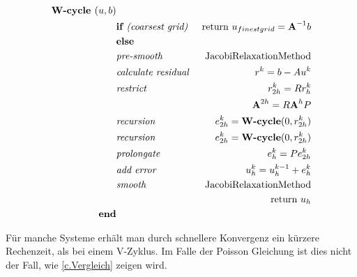 \begin{eqnarray}
\textbf{W-cycle }(u,b)                         & \notag \\
&\textbf{if }\textit{(coarsest grid) }&\textnormal{return } u_{finest grid}={\textbf{A}}^{-1}b \notag \\
&\textbf{else }                                                & \notag \\
&\textit{pre-smooth }                                 &\textnormal{JacobiRelaxationMethod} \notag \\
&\textit{calculate residual }                &r^{k} = b - Au^{k} \notag \\
&\textit{restrict }                                 &r^{k}_{2h}=Rr^{k}_{h} \notag \\
&                                                                        &{\textbf{A}}^{2h} = R{\textbf{A}}^{h}P \notag \\
&\textit{recursion }                                &e^{k}_{2h} = \textbf{W-cycle}(0,r^{k}_{2h}) \notag \\
&\textit{recursion }                                &e^{k}_{2h} = \textbf{W-cycle}(0,r^{k}_{2h}) \notag \\
&\textit{prolongate }                                &e^{k}_{h} = Pe^{k}_{2h} \notag \\
&\textit{add error }                                &u^{k}_{h} = u^{k-1}_{h} + e^{k}_{h} \notag \\
&\textit{smooth }                                        &\textnormal{JacobiRelaxationMethod} \notag \\
&                                                                        &\textnormal{return } u_{h} \notag \\
\textbf{end}                                                & \notag
\end{eqnarray}

\label{img.W-cycle}

Für manche Systeme erhält man durch schnellere Konvergenz ein kürzere Rechenzeit, als bei einem V-Zyklus. Im Falle der Poisson Gleichung ist dies nicht der Fall, wie \autoref{c.Vergleich} zeigen wird.


